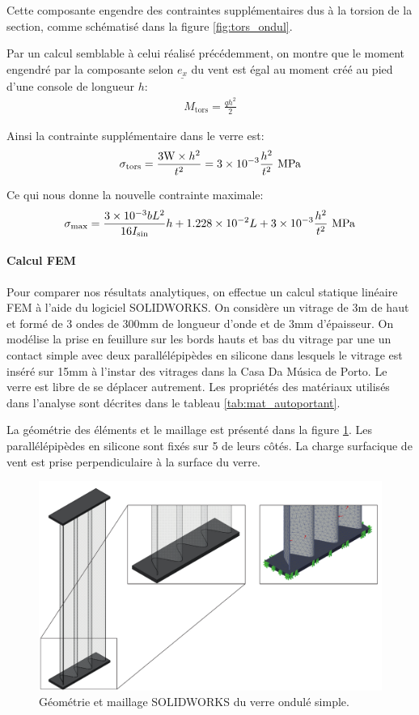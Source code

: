 \documentclass[11pt,titlepage]{article}
\begin{document}
Cette composante engendre des contraintes supplémentaires dus à la torsion de la section, comme schématisé dans la figure \ref{fig:tors_ondul}.

Par un calcul semblable à celui réalisé précédemment, on montre que le moment engendré par la composante selon $\underline{e_x}$ du vent est égal au moment créé au pied d'une console de longueur $h$:
\begin{align}
    M_{\text{tors}} = \frac{q h^2}{2}
\end{align}

Ainsi la contrainte supplémentaire dans le verre est:
\begin{align}
    \sigma_{\text{tors}} = \frac{3\text{W}\times h^2}{t^2} = \num{3d-3} \frac{h^2}{t^2}\text{ }\unit{\mega\pascal}
\end{align}

Ce qui nous donne la nouvelle contrainte maximale:
\begin{align}
    \sigma_{\text{max}} = \frac{\num{3d-3} b L^2}{16 I_{\text{sin}}}h + \num{1.228d-2} L + \num{3d-3} \frac{h^2}{t^2}\text{ }\unit{\mega\pascal}\label{eq:s_maxondul}
\end{align}
\paragraph{Calcul \acrshort{FEM}}\mbox{}

Pour comparer nos résultats analytiques, on effectue un calcul statique linéaire \acrshort{FEM} à l'aide du logiciel SOLIDWORKS. On considère un vitrage de 3m de haut et formé de 3 ondes de 300mm de longueur d'onde et de 3mm d'épaisseur. On modélise la prise en feuillure sur les bords hauts et bas du vitrage par une un contact simple avec deux parallélépipèdes en silicone dans lesquels le vitrage est inséré sur 15mm à l'instar des vitrages dans la Casa Da Música de Porto. Le verre est libre de se déplacer autrement. Les propriétés des matériaux utilisés dans l'analyse sont décrites dans le tableau \ref{tab:mat_autoportant}.

La géométrie des éléments et le maillage est présenté dans la figure \ref{fig:ondulmaill}. Les parallélépipèdes en silicone sont fixés sur 5 de leurs côtés. La charge surfacique de vent est prise perpendiculaire à la surface du verre.

\begin{figure}[H]
    \centering
    \includegraphics[width=0.8\linewidth]{img/ondul/fem/maillage_simple.pdf}
    \caption{Géométrie et maillage SOLIDWORKS du verre ondulé simple.}
    \label{fig:ondulmaill}
\end{figure}
\end{document}
